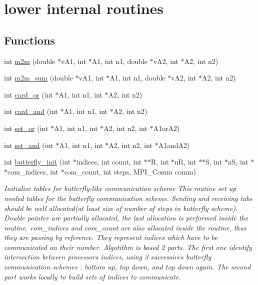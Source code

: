 \hypertarget{group__matmap__group22}{\section{lower internal routines}
\label{group__matmap__group22}
}
\subsection*{Functions}
\begin{DoxyCompactItemize}
\item 
int \hyperlink{group__matmap__group22_ga3097d396b49c10414a79152f4ebd2902}{m2m} (double $\ast$v\-A1, int $\ast$A1, int n1, double $\ast$v\-A2, int $\ast$A2, int n2)
\item 
int \hyperlink{group__matmap__group22_ga28c05d496e6168337d8a466affc1d0ac}{m2m\-\_\-sum} (double $\ast$v\-A1, int $\ast$A1, int n1, double $\ast$v\-A2, int $\ast$A2, int n2)
\item 
int \hyperlink{group__matmap__group22_ga53acb71f83d76d42080a2fd8b4ad06b1}{card\-\_\-or} (int $\ast$A1, int n1, int $\ast$A2, int n2)
\item 
int \hyperlink{group__matmap__group22_ga67a8ef3c535fc47af99024fa2de0b3c5}{card\-\_\-and} (int $\ast$A1, int n1, int $\ast$A2, int n2)
\item 
int \hyperlink{group__matmap__group22_ga07e3dbbce334f3744a3eb27174780a7c}{set\-\_\-or} (int $\ast$A1, int n1, int $\ast$A2, int n2, int $\ast$A1or\-A2)
\item 
int \hyperlink{group__matmap__group22_ga3beac6a118c373a422f4772144306add}{set\-\_\-and} (int $\ast$A1, int n1, int $\ast$A2, int n2, int $\ast$A1and\-A2)
\item 
int \hyperlink{group__matmap__group22_gabe7077466aef706a7825e650a78f4e5e}{butterfly\-\_\-init} (int $\ast$indices, int count, int $\ast$$\ast$R, int $\ast$n\-R, int $\ast$$\ast$S, int $\ast$n\-S, int $\ast$$\ast$com\-\_\-indices, int $\ast$com\-\_\-count, int steps, M\-P\-I\-\_\-\-Comm comm)
\begin{DoxyCompactList}\small\item\em Initialize tables for butterfly-\/like communication scheme This routine set up needed tables for the butterfly communication scheme. Sending and receiving tabs should be well allocated(at least size of number of steps in butterfly scheme). Double pointer are partially allocated, the last allocation is performed inside the routine. com\-\_\-indices and com\-\_\-count are also allocated inside the routine, thus they are passing by reference. They represent indices which have to be communicated an their number. Algotithm is based 2 parts. The first one identify intersection between processors indices, using 3 successives butterfly communication schemes \-: bottom up, top down, and top down again. The second part works locally to build sets of indices to communicate. \end{DoxyCompactList}\item 
$$
\end{DoxyCompactItemize}
